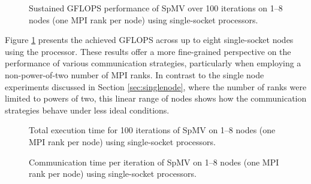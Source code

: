 \begin{figure}[H]
    \centering
    \caption{Sustained GFLOPS performance of SpMV over 100 iterations on 1–8 nodes (one MPI rank per node) using single-socket \romeq{} processors.}
    \label{fig:gflopsromemulti}
\end{figure}

Figure \ref{fig:gflopsromemulti} presents the achieved GFLOPS across up to eight single-socket nodes using the \romeq{} processor. These results offer a more fine-grained perspective on the performance of various communication strategies, particularly when employing a non-power-of-two number of MPI ranks. In contrast to the single node experiments discussed in Section \ref{sec:singlenode}, where the number of ranks were limited to powers of two, this linear range of nodes shows how the communication strategies behave under less ideal conditions.
\medskip






\begin{figure}[H]
    \centering
    \caption{Total execution time for 100 iterations of SpMV on 1–8 nodes (one MPI rank per node) using single-socket \romeq{} processors.}
    \label{fig:tromemulti}
\end{figure}

\begin{figure}[H]
    \centering
    \caption{Communication time per iteration of SpMV on 1–8 nodes (one MPI rank per node) using single-socket \romeq{} processors.}
    \label{fig:tcommromemulti}
\end{figure}

